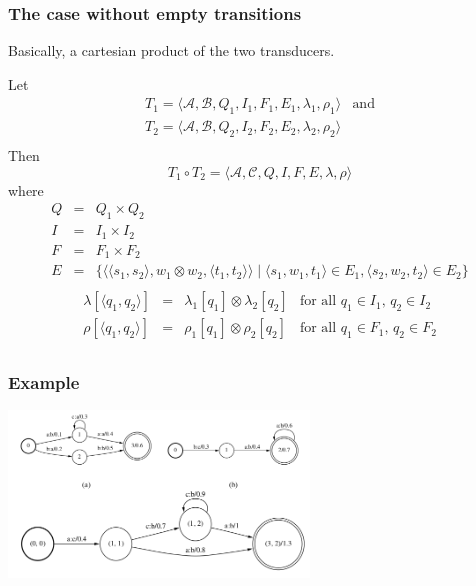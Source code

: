 \documentclass{beamer}
\newcommand{\<}{\langle}
\renewcommand{\>}{\rangle}
\begin{document}
\begin{frame}
  \frametitle{The case without empty transitions}

  Basically, a cartesian product of the two transducers.

  Let 
$$
\begin{array}{ll}
T_1 = \<\mathcal{A}, \mathcal{B}, Q_1, I_1, F_1, E_1, \lambda_1, \rho_1\> &
  \mbox{and} \\
T_2 = \<\mathcal{A}, \mathcal{B}, Q_2, I_2, F_2, E_2, \lambda_2, \rho_2\> \\
\end{array}
$$
Then
$$
T_1 \circ T_2 = \<\mathcal{A}, \mathcal{C}, Q, I, F, E, \lambda, \rho\>
$$
where
$$
\begin{array}{rcll}
  Q & = & Q_1 \times Q_2 \\
  I & = & I_1 \times I_2 \\
  F & = & F_1 \times F_2 \\
  E & = & \{\<\<s_1,s_2\>, w_1 \otimes w_2, \<t_1, t_2\>\> \; | \; \<s_1,w_1,t_1\>
              \in E_1, \<s_2, w_2, t_2\> \in E_2\} \\
\end{array}
$$
$$
\begin{array}{rcll}
  \lambda[\<q_1,q_2\>] & = & \lambda_1[q_1]\otimes\lambda_2[q_2] & \mbox{for
    all $q_1 \in I_1$, $q_2 \in I_2$} \\
  \rho[\<q_1,q_2\>] & = & \rho_1[q_1]\otimes\rho_2[q_2] & \mbox{for
    all $q_1 \in F_1$, $q_2 \in F_2$} \\
\end{array}
$$
\end{frame}

\begin{frame}
  \frametitle{Example}
  \includegraphics[width=8cm]{composition-example-0.png}  
\end{frame}
\end{document}
